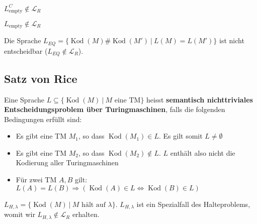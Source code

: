 \begin{lemma}
\( L_\text{empty}^C \notin \mathcal{L}_R \)\\
\end{lemma}

\begin{corollary}
\( L_\text{empty} \notin \mathcal{L}_R \) \\
\end{corollary}

\begin{corollary}
Die Sprache \( L_{EQ} = \{\operatorname{Kod}(M)\#\operatorname{Kod}(M') \ |\ L(M) = L(M')\} \) ist nicht entscheidbar (\( L_{EQ} \notin \mathcal{L}_R\)).\\
\end{corollary}

\subsection{Satz von Rice}
\begin{definition}
Eine Sprache \( L \subseteq \{\operatorname{Kod}(M) \ |\ M \text{ eine TM}\} \) heisst \textbf{semantisch nichttriviales Entscheidungsproblem über Turingmaschinen}, falls die folgenden Bedingungen erfüllt sind:
\begin{itemize}
  \item Es gibt eine TM \( M_1 \), so dass \( \operatorname{Kod}(M_1) \in L \). Es gilt somit \(L \not= \emptyset\)
  \item Es gibt eine TM \( M_2 \), so dass \( \operatorname{Kod}(M_2) \notin L \). \(L\) enthält also nicht die Kodierung aller Turingmaschinen
  \item Für zwei TM \(A, B\) gilt: \( L(A) = L(B) \Rightarrow (\operatorname{Kod}(A) \in L \Leftrightarrow \operatorname{Kod}(B) \in L) \)\\
\end{itemize}

\end{definition}

\begin{lemma}
\( L_{H,\lambda} = \{ \operatorname{Kod}(M) \ |\ M \text{ hält auf } \lambda \} \). \(L_{H,\lambda}\) ist ein Spezialfall des Halteproblems, womit wir \(L_{H,\lambda} \notin \mathcal{L}_R\) erhalten.
\end{lemma}




